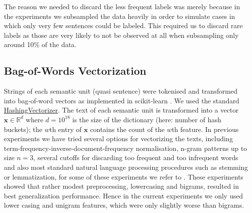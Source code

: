 \documentclass[runningheads,a4paper]{article}
\renewcommand{\vec}[1]{\mathbf{#1}}
\begin{document}
The reason we needed to discard the less frequent labels was merely because in the experiments we subsampled the data heavily in order to simulate cases in which only very few sentences could be labeled. This required us to discard rare labels as those are very likely to not be observed at all when subsampling only around 10\% of the data. 

\subsection{Bag-of-Words Vectorization}\label{sec:bow-vectorization}
Strings of each semantic unit (quasi sentence) were tokenised and transformed into bag-of-word vectors as implemented in scikit-learn \cite{scikit-learn}. We used the standard \href{http://scikit-learn.org/stable/modules/generated/sklearn.feature_extraction.text.HashingVectorizer.html}{HashingVectorizer}. The text of each semantic unit is transformed into a vector $\vec{x}\in\mathds{R}^d$ where $d=10^{18}$ is the size of the dictionary (here: number of hash buckets); the $w$th entry of $\vec{x}$ contains the count of the $w$th feature. In previous experiments we have tried several options for vectorizing the texts, including term-frequency-inverse-document-frequency normalisation, n-gram patterns up to size $n=3$, several cutoffs for discarding too frequent and too infrequent words and also most standard natural language processing procedures such as stemming or lemmatization, for some of these experiments we refer to \cite{Biessmann16}. These experiments showed that rather modest preprocessing, lowercasing and bigrams, resulted in best generalization performance. Hence in the current experiments we only used lower casing and unigram features, which were only slightly worse than bigrams.
\end{document}
